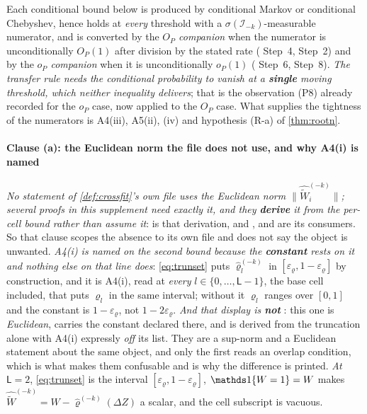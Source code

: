 Each conditional bound below is produced by conditional Markov or conditional Chebyshev, hence holds at
\emph{every} threshold with a $\sigma(\mathcal I_{-k})$-measurable numerator, and is converted by the
\emph{$O_P$ companion} when the numerator is unconditionally $O_P(1)$ after division by the stated rate
( Step~4,  Step~2) and by the \emph{$o_P$ companion} when it is
unconditionally $o_P(1)$ ( Step~6,  Step~8). \emph{The transfer rule
needs the conditional probability to vanish at a \textbf{single} moving threshold, which neither
inequality delivers}; that is the observation \textup{(P8)} already recorded for the $o_P$ case, now
applied to the $O_P$ case. What supplies the tightness of the numerators is A4(iii), A5(ii), (iv) and
hypothesis (R-a) of \cref{thm:rootn}.

\paragraph{Clause \textup{(a)}: the Euclidean norm the file does not use, and why A4(i) is named}

\emph{No statement of \cref{def:crossfit}'s own file uses the Euclidean norm
$\|\widehat{\widetilde W}^{(-k)}_i\|$; several proofs in this supplement need exactly it, and they
\textbf{derive} it from the per-cell bound rather than assume it}:  is that
derivation, and ,  and  are its
consumers. So that clause scopes the absence to its own file and does not say the object is unwanted.
\emph{A4(i) is named on the second bound because the \textbf{constant} rests on it and nothing else on
that line does}: \eqref{eq:trunset} puts $\hat\varrho^{(-k)}_l$ in
$[\varepsilon_\varrho,1-\varepsilon_\varrho]$ by construction, and it is A4(i), read at \emph{every}
$l\in\{0,\dots,\mathsf L-1\}$, the base cell included, that puts $\varrho_l$ in the same interval;
without it $\varrho_l$ ranges over $[0,1]$ and the constant is $1-\varepsilon_\varrho$, not
$1-2\varepsilon_\varrho$. \emph{And that display is \textbf{not} }: this one is
\emph{Euclidean}, carries the constant declared there, and is derived from the truncation alone with
A4(i) expressly \emph{off} its list. They are a sup-norm and a Euclidean statement about the same
object, and only the first reads an overlap condition, which is what makes them confusable and is why
the difference is printed. \emph{At $\mathsf L=2$}, \eqref{eq:trunset} is the interval
$[\varepsilon_\varrho,1-\varepsilon_\varrho]$, $\un\{W=1\}=W$ makes
$\widehat{\widetilde W}^{(-k)}=W-\hat\varrho^{(-k)}(\Delta Z)$ a scalar, and the cell subscript is
vacuous.

